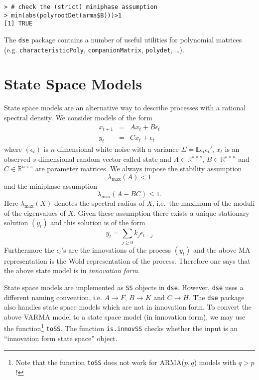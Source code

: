 \documentclass[]{article}
\let\rmarkdownfootnote\footnote%
\def\footnote{\protect\rmarkdownfootnote}
\begin{document}
\begin{verbatim}
> # check the (strict) miniphase assumption 
> min(abs(polyrootDet(arma$B)))>1
[1] TRUE
\end{verbatim}

The \texttt{dse} package contains a number of useful utilities for
polynomial matrices (e.g. \texttt{characteristicPoly},
\texttt{companionMatrix}, \texttt{polydet}, \ldots{}).

\section{State Space Models}\label{state-space-models}

State space models are an alternative way to describe processes with a
rational spectral density. We consider models of the form \[
\begin{array}{rcl}
x_{t+1} &=& A x_t + B \epsilon_t \\ 
y_t &=& C x_t + \epsilon_t
\end{array}
\] where \((\epsilon_t)\) is \(n\)-dimensional white noise with a
variance \(\Sigma =\mathbb{E}\epsilon_t \epsilon_t '\), \(x_t\) is an
observed \(s\)-dimensional random vector called state and
\(A\in\mathbb{R}^{s\times s}\), \(B\in\mathbb{R}^{s\times n}\) and
\(C\in\mathbb{R}^{n\times s}\) are parameter matrices. We always impose
the stability assumption \[
\lambda_{\max} (A) <1
\] and the miniphase assumption \[
\lambda_{\max} (A-BC) \leq 1.
\] Here \(\lambda_{\max}(X)\) denotes the spectral radius of \(X\),
i.e.~the maximum of the moduli of the eigenvalues of \(X\). Given these
assumption there exists a unique stationary solution \((y_t)\) and this
solution is of the form \[
y_t = \sum_{j\geq 0} k_j \epsilon_{t-j}
\] Furthermore the \(\epsilon_t\)'s are the innovations of the process
\((y_t )\) and the above MA representation is the Wold representation of
the process. Therefore one says that the above state model is in
\emph{innovation form}.

State space models are implemented as \texttt{SS} objects in
\texttt{dse}. However, \texttt{dse} uses a different naming convention,
i.e. \(A \rightarrow F\), \(B \rightarrow K\) and \(C \rightarrow H\).
The \texttt{dse} package also handles state space models which are not
in innovation form. To convert the above VARMA model to a state space
model (in innovation form), we may use the function\footnote{Note that
  the function \texttt{toSS} does not work for ARMA(\(p,q\)) models with
  \(q>p\)!} \texttt{toSS}. The function \texttt{is.innovSS} checks
whether the input is an ``innovation form state space'' object.
\end{document}
